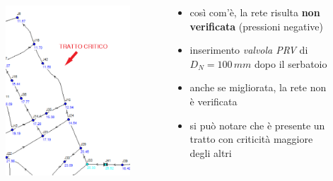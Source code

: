 \documentclass{beamer}
\begin{document}
\begin{frame}
\begin{columns}
\begin{column}{.5\textwidth}
\begin{figure}
\begin{overprint}
\begin{minipage}[c][.8\textheight][c]{\linewidth}
			\centering
			\includegraphics[height=.7\pdfpageheight]{images/tratto_critico}
		\end{minipage}
	  \end{overprint}
	  \end{figure}
	 \end{column}
%
	\begin{column}{.5\textwidth}
		\begin{itemize}[<+->]
		 \onslide<1>\item così com'è, la rete risulta \textbf{non verificata} (pressioni negative)
		 \onslide<2>\item inserimento \emph{valvola PRV} di $D_N = 100\,mm$ dopo il serbatoio
		 \onslide<3>\item anche se migliorata, la rete non è verificata
		 \onslide<4>\item si può notare che è presente un tratto con criticità maggiore degli altri 
		\end{itemize}
	\end{column}
 \end{columns}
\end{frame}
%
\end{document}
